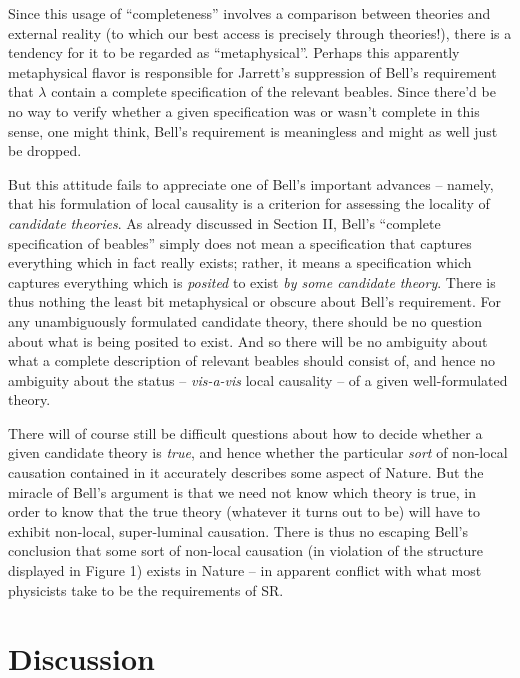 \documentclass[aps,prc,twocolumn]{revtex4}
\begin{document}
Since this usage of ``completeness'' involves a comparison between
theories and external reality (to which our best access is precisely
through theories!), there is a tendency for it to be regarded as
``metaphysical''.  
Perhaps this apparently metaphysical flavor is
responsible for Jarrett's suppression of
Bell's requirement that $\lambda$ contain a complete specification of
the relevant beables.  Since there'd be no way to verify whether a given
specification was or wasn't complete in this sense, one might think,
Bell's requirement is meaningless and might as well just be dropped.  

But this attitude fails to appreciate one of 
Bell's important advances -- namely, that his formulation of local
causality is a criterion for assessing the locality of \emph{candidate
  theories}.  As already discussed in Section II, Bell's ``complete
specification of beables'' simply does not mean a specification that
captures everything which in fact really exists; rather, it means a
specification which captures everything which is \emph{posited} to
exist \emph{by some candidate theory}.  There is thus nothing the
least bit metaphysical or obscure about Bell's requirement.  For any
unambiguously formulated candidate theory, there should be no question 
about what
is being posited to exist.  And so there will be no ambiguity about
what a complete description of relevant beables should consist of, and
hence no ambiguity about the status -- \emph{vis-a-vis} local
causality  -- of a given well-formulated theory.  

There will of course still be
difficult questions about how to decide whether a given candidate
theory is \emph{true}, and hence whether the particular \emph{sort} of
non-local causation contained in it accurately describes some aspect
of Nature.  But the miracle of Bell's argument is that we
need not know which theory is true, in order to know that the true
theory (whatever it turns out to be) will have to exhibit non-local,
super-luminal causation.  There is thus no escaping Bell's conclusion
that some sort of non-local causation (in violation of the structure
displayed in Figure 1) exists in Nature -- in apparent conflict with
what most physicists take to be the requirements of SR.


\section{Discussion}
\end{document}
